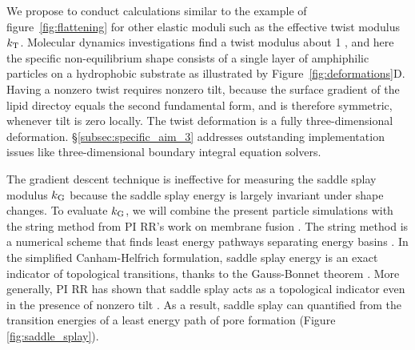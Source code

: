 We propose to conduct calculations similar to the example of figure~\ref{fig:flattening} for other elastic moduli such as the effective twist modulus $k_{\mathrm{T}}$.
Molecular dynamics investigations find a twist modulus about 1 \kBT
\cite{LeVeWa14}, and here the specific non-equilibrium shape consists of
a single layer of amphiphilic particles on a hydrophobic substrate as
illustrated by Figure~\ref{fig:deformations}D. Having a nonzero twist
requires nonzero tilt, because the surface gradient of the lipid
directoy equals the second fundamental form, and is therefore symmetric,
whenever tilt is zero locally. The twist deformation is a fully
three-dimensional deformation. \S\ref{subsec:specific_aim_3} addresses outstanding implementation issues like three-dimensional boundary integral equation solvers.

%
The gradient descent technique is ineffective for measuring the saddle splay modulus $k_{\mathrm{G}}$ because
the saddle splay energy is largely invariant under shape changes.
To evaluate $k_{\mathrm{G}}$, we will combine the present particle simulations with the string method 
from PI RR's work on membrane fusion \cite{RyKlYaCo16}. The string method is a numerical scheme that finds
least energy pathways separating energy basins \cite{doi:10.1063/1.2720838}. 
In the simplified Canham-Helfrich formulation, saddle splay energy is an exact indicator of topological transitions, 
thanks to the  Gauss-Bonnet theorem \cite{TerziDeserno17}.
More generally, PI RR has shown that saddle splay acts as a topological indicator even in the presence of nonzero tilt \cite{RyKlYaCo16}. 
As a result, saddle splay can quantified from the transition energies of a least energy path of pore formation (Figure \ref{fig:saddle_splay}).   
%
%

